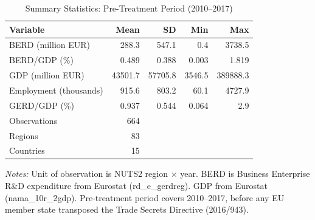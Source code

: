 \begin{table}[htbp]
\centering
\caption{Summary Statistics: Pre-Treatment Period (2010--2017)}
\label{tab:summary}
\begin{tabular}{lrrrr}
\hline\hline
Variable & Mean & SD & Min & Max \\
\hline
BERD (million EUR) & 288.3 & 547.1 & 0.4 & 3738.5 \\
BERD/GDP (\%) & 0.489 & 0.388 & 0.003 & 1.819 \\
GDP (million EUR) & 43501.7 & 57705.8 & 3546.5 & 389888.3 \\
Employment (thousands) & 915.6 & 803.2 & 60.1 & 4727.9 \\
GERD/GDP (\%) & 0.937 & 0.544 & 0.064 & 2.9 \\
\hline
Observations & 664 &  &  &  \\
Regions & 83 &  &  &  \\
Countries & 15 &  &  &  \\
\hline\hline
\end{tabular}
\begin{tablenotes}[flushleft]
\small
\item \textit{Notes:} Unit of observation is NUTS2 region $\times$ year. BERD is Business Enterprise R\&D expenditure from Eurostat (rd\_e\_gerdreg). GDP from Eurostat (nama\_10r\_2gdp). Pre-treatment period covers 2010--2017, before any EU member state transposed the Trade Secrets Directive (2016/943).
\end{tablenotes}
\end{table}
